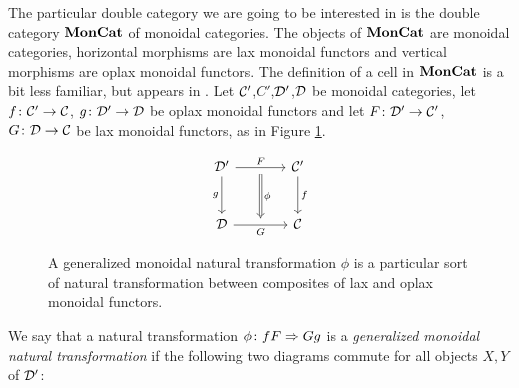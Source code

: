 \documentclass{article}
\begin{document}
The particular double category we are going to be interested in is the double category ${\normalfont\textbf{MonCat}}$ of monoidal categories.  
The objects of ${\normalfont\textbf{MonCat}}$ are monoidal categories, horizontal morphisms are lax monoidal functors and vertical morphisms are oplax monoidal functors.  
The definition of a cell in ${\normalfont\textbf{MonCat}}$ is a bit less familiar, but appears in \cite{AdjointsInDoubleCategories}.  
  Let ${\mathcal{C}}'$,$C'$,${\mathcal{D}}'$,${\mathcal{D}}$ be monoidal categories, let $f\colon{\mathcal{C}}'\to{\mathcal{C}}$, $g\colon {\mathcal{D}}'\to {\mathcal{D}}$ be oplax monoidal functors and let $F\colon{\mathcal{D}}'\to{\mathcal{C}}'$, $G\colon{\mathcal{D}}\to{\mathcal{C}}$ be lax monoidal functors, as in Figure \ref{fig:generalized-monoidal-setup}.

  \begin{figure}
    \[
      \begin{tikzcd}[row sep=large, column sep=large]
        \D' \arrow[r, "F", ""'{name=F}] \arrow[d, "g"']
          & \C' \arrow[d, "f"] \\
        \D \arrow[r, "G"', ""{name=G}]
          & \C
        \arrow[Rightarrow, from=F, to=G, "\phi"]
      \end{tikzcd}
      \]
    \caption{A generalized monoidal natural transformation $\phi$ is a particular sort of natural transformation between composites of lax and oplax monoidal functors.}
    \label{fig:generalized-monoidal-setup}
  \end{figure}

We say that a natural transformation $\phi\colon fF\Rightarrow Gg$ is a \emph{generalized monoidal natural transformation} if the following two diagrams commute for all objects $X,Y$ of ${\mathcal{D}}'$:
\end{document}
